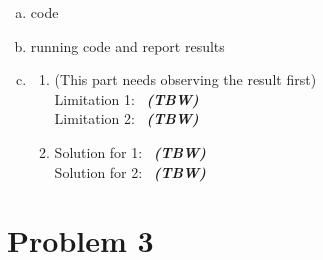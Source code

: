 \documentclass[11pt, oneside]{article}      %
\newcommand{\df}{\bfseries \em}  %
\newcommand{\tbw}{\bigskip \mbox{\color{red} {\df (TBW) }}\bigskip}
\newcommand{\hasPageBreak}{}
\begin{document}
\begin{enumerate}   [(a)]
\item code
\item running code and report results
\item 
\begin{enumerate}   [i]
\item (This part needs observing the result first)  \\
 Limitation 1: \tbw \\
 Limitation 2: \tbw 
 \item Solution for 1: \tbw \\
 Solution for 2: \tbw
\end{enumerate}

\end{enumerate}




\hasPageBreak
\section*{Problem 3}
\end{document}

